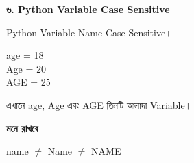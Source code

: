 
\textbf{\color{darkTeal}৬. Python Variable Case Sensitive}

Python Variable Name Case Sensitive।

\begin{codebox}

\begin{english}
\ttfamily
age = 18\\
Age = 20\\
AGE = 25
\end{english}

\end{codebox}

এখানে
\textenglish{\ttfamily age},
\textenglish{\ttfamily Age}
এবং
\textenglish{\ttfamily AGE}
তিনটি আলাদা Variable।

\begin{rememberbox}

\textbf{\color{deepOrange}মনে রাখবে}

\begin{center}

\textenglish{\ttfamily name}
\(\neq\)
\textenglish{\ttfamily Name}
\(\neq\)
\textenglish{\ttfamily NAME}

\end{center}

\end{rememberbox}




